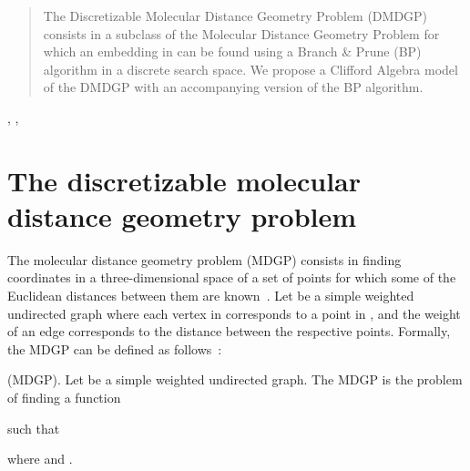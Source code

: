 \documentclass{proc}
\begin{document}

\author{Alessandro Andrioni}





\begin{abstract}
The Discretizable Molecular Distance Geometry Problem (DMDGP) consists in a subclass of the Molecular Distance Geometry Problem for which an embedding in  can be found using a Branch \& Prune (BP) algorithm in a discrete search space. We propose a Clifford Algebra model of the DMDGP with an accompanying version of the BP algorithm.
\end{abstract}

\begin{keywords}
, , 
\end{keywords}

\section{The discretizable molecular distance geometry problem}
\label{dmdgp}
The molecular distance geometry problem (MDGP) consists in finding coordinates in a three-dimensional space of a set of points  for which some of the Euclidean distances between them are known~\cite{crippen}. Let  be a simple weighted undirected graph where each vertex in  corresponds to a point in , and the weight of an edge corresponds to the distance  between the respective points. Formally, the MDGP can be defined as follows~\cite{dmdgp}:
\begin{definition}
(MDGP). Let  be a simple weighted undirected graph. The MDGP is the problem of finding a function

such that

where  and .
\end{definition}
\end{document}
